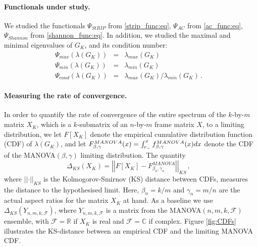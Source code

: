 \documentclass[a4paper,12pt]{article}
\newcommand{\TODO}[1]{ {\tt \color{red} [TODO:#1] } }
\newcommand{\R}{\ensuremath{\mathbb{R}}}
\newcommand{\C}{\ensuremath{\mathbb{C}}}
\newcommand{\Fc}{\ensuremath{\mathcal{F}}}
\newcommand{\m}{m}
\newcommand{\norm}[1]{\left|\left| #1 \right|\right|}
\newcommand{\specstat}{\ensuremath{\Psi}}
\newcommand{\Xk}{\ensuremath{X_K}}
\newcommand{\Gk}{\ensuremath{G_K}}
\begin{document}

\paragraph{Functionals under study.}

We studied the functionals $\specstat_{StRIP}$ from \eqref{strip_func:eq}, 
$\specstat_{AC}$ from \eqref{ac_func:eq}, $\specstat_{Shannon}$ from
\eqref{shannon_func:eq}. In addition, we studied the maximal and minimal
eigenvalues of $\Gk$, and its condition number:
\begin{eqnarray*}
\specstat_{max}(\lambda(\Gk)) &=&  \lambda_{max}(\Gk) \\
\specstat_{min}(\lambda(\Gk)) &=&  \lambda_{min}(\Gk) \\
\specstat_{cond}(\lambda(\Gk)) &=&  \lambda_{max}(\Gk) / \lambda_{min}(\Gk)\,. 
\end{eqnarray*}



\paragraph{Measuring the rate of convergence.}
%
In order to quantify the rate of convergence of the entire spectrum 
of the $k$-by-$\m$ matrix 
$\Xk$, which is a $k$-submatrix of an $n$-by-$\m$ frame matrix $X$, to a limiting
distribution, we let $F[\Xk]$ denote the
empirical cumulative distribution function (CDF) of $\lambda(\Gk)$, and 
let $F^{MANOVA}_{\beta,\gamma}(x) = \intop_{r_-}^x
f^{MANOVA}_{\beta,\gamma}(x)dx$ denote the CDF of the MANOVA$(\beta,\gamma)$
limiting distribution. 
The quantity
\[
\Delta_{KS}(\Xk) = \norm{F[\Xk] - F^{MANOVA}_{\beta_n,\gamma_n}}_{KS}\,,
\]
where $\norm{\cdot}_{KS}$ is the Kolmogorov-Smirnov (KS) distance between CDFs, 
measures the distance to the hypothesised limit. Here, 
$\beta_n=k/m$ and $\gamma_n=m/n$ are the actual aspect ratios for the matrix $\Xk$ at hand.
As a baseline we use $\Delta_{KS}( Y_{n,\m,k,\Fc})$, where 
$Y_{n,\m,k,\Fc}$ is a matrix from the MANOVA$(n,\m,k,\Fc)$ ensemble,
with $\Fc=\R$ if $X_K$ is real and $\Fc=\C$ if complex.
Figure \ref{fig:CDFs} illustrates the KS-distance 
between an empirical CDF and the limiting MANOVA CDF.
\end{document}
